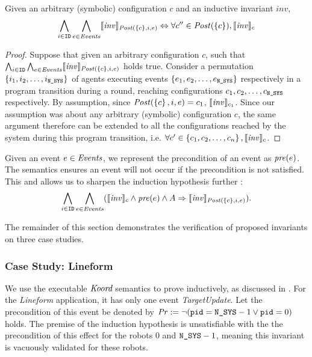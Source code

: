 \begin{lemma}
   \label{noninter}
Given an arbitrary (symbolic) configuration $c$ and an inductive invariant $\mathit{inv}$,
   {\small
   $$\bigwedge_{i\in \texttt{ID}}\bigwedge_{e \in \mathit{Events}}  \llbracket\mathit{inv}\rrbracket_{\mathit{Post}(\left\{c\right\}, i, e)} \Leftrightarrow \forall c'' \in \mathit{Post}(\left\{c\right\}), \llbracket\mathit{inv}\rrbracket_{c}$$ }
\end{lemma}
\begin{proof}
Suppose that given an arbitrary configuration $c$, such that $\bigwedge_{i\in \texttt{ID}}\bigwedge_{e \in \mathit{Events}} \llbracket\mathit{inv}\rrbracket_{\mathit{Post}(\left\{c\right\}, i, e)}$ holds true. Consider a permutation $\left\{i_1,i_2,\ldots,i_{\texttt{N\_SYS}}\right\}$ of agents executing events $\left\{e_1, e_2, \ldots , e_{\texttt{N\_SYS}}\right\}$ respectively in a program transition during a round, reaching configurations $c_1, c_2, \ldots, c_{\texttt{N\_SYS}}$ respectively. By assumption, since $\mathit{Post}(\left\{c\right\},i,e) = c_1$, $\llbracket\mathit{inv}\rrbracket_{c_1}$. Since our assumption was about any arbitrary (symbolic) configuration $c$, the same argument therefore can be extended to all the configurations reached by the system during this program transition, i.e. $\forall c' \in \left\{c_1, c_2, \ldots, c_n\right\}, \llbracket\mathit{inv}\rrbracket_{c}$.
\end{proof}

Given an event $e\in \mathit{Events}$, we represent the precondition of an event as $\mathit{pre}(e)$. The semantics ensures an event will not occur if the precondition is not satisfied. This and  allows us to sharpen the induction hypothesis further :
    $$ \bigwedge_{i\in \texttt{ID}} \bigwedge_{e \in \mathit{Events}}  (\llbracket\mathit{inv}\rrbracket_{c} \wedge \mathit{pre}(e) \wedge A \Rightarrow \llbracket\mathit{inv}\rrbracket_{\mathit{Post}(\left\{c\right\}, i, e) }).$$


The remainder of this section demonstrates the verification of proposed invariants on three case studies.


\subsubsection*{Case Study: Lineform}
 We use the executable $\emph{Koord}$ semantics to prove  inductively, as discussed in . For the \emph{Lineform} application, it has only one event \emph{TargetUpdate}. Let the precondition of this event be denoted by $\mathit{Pr}:= \neg (\texttt{pid} = \texttt{N\_SYS} - 1 \vee \texttt{pid} = 0)$ holds. The premise of the induction hypothesis is unsatisfiable with the the precondition of this effect for the robots $0$ and $\texttt{N\_SYS}-1$, meaning this invariant is vacuously validated for these robots.


